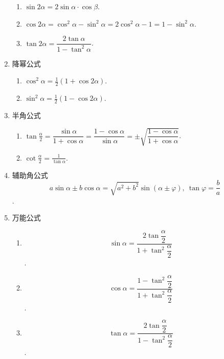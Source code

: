 \documentclass[lang=cn,10pt]{elegantbook}
\begin{document}
\begin{enumerate}
	\begin{enumerate}
		\item \( \sin 2\alpha = 2\sin\alpha \cdot \cos \beta \).
		\item \( \cos2\alpha = \cos^{2}\alpha - \sin^{2}\alpha = 2\cos^{2}\alpha - 1 = 1 - \sin^{2}\alpha \).
		\item \( \displaystyle\tan2\alpha = \dfrac{2\tan\alpha}{1 - \tan^{2}\alpha} \).
	\end{enumerate}
	\item 降幂公式
	\begin{enumerate}
		\item \( \cos^{2}\alpha = \frac{1}{2}(1 + \cos2\alpha) \).
		\item \( \sin^{2}\alpha = \frac{1}{2}(1 - \cos2\alpha) \).
	\end{enumerate}
	\item 半角公式
	\begin{enumerate}
		\item \( \tan\frac{\alpha}{2} = \dfrac{\sin\alpha}{1 + \cos\alpha} = \dfrac{1 - \cos\alpha}{\sin\alpha} = \pm \sqrt{\dfrac{1 - \cos\alpha}{1 + \cos\alpha}} \).
		\item \( \displaystyle \cot\frac{\alpha}{2} = \frac{1}{\tan\alpha} \).
	\end{enumerate}
	\item 辅助角公式
	\[  a\sin\alpha \pm b\cos\alpha = \sqrt{a^{2} + b^{2}}\sin(\alpha \pm \varphi),\ \tan\varphi = \frac{b}{a}\].
	\item 万能公式
	\begin{enumerate}
		\item \[ \sin\alpha = \dfrac{2\tan\dfrac{\alpha}{2}}{1 + \tan^{2}\dfrac{\alpha}{2}} \].
		\item \[ \cos\alpha = \dfrac{1 - \tan^{2}\dfrac{\alpha}{2}}{1 + \tan^{2}\dfrac{\alpha}{2}} \].
		\item \[ \tan\alpha= \dfrac{2\tan\dfrac{\alpha}{2}}{1 - \tan^{2}\dfrac{\alpha}{2}}\].
	\end{enumerate}
\end{enumerate}
\end{document}
